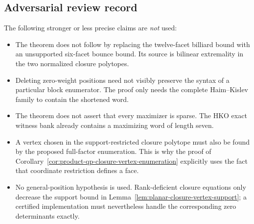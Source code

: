 \begin{unverified}
\subsection{Adversarial review record}
\label{subsec:product-qp-six-facet-adversarial-review}

The following stronger or less precise claims are \emph{not} used:
\begin{itemize}
  \item The theorem does not follow by replacing the twelve-facet billiard
    bound with an unsupported six-facet bounce bound.  Its source is bilinear
    extremality in the two normalized closure polytopes.
  \item Deleting zero-weight positions need not visibly preserve the syntax of
    a particular block enumerator.  The proof only needs the complete
    Haim--Kislev family to contain the shortened word.
  \item The theorem does not assert that every maximizer is sparse.  The HKO
    exact witness bank already contains a maximizing word of length seven.
  \item A vertex chosen in the support-restricted closure polytope must also be
    found by the proposed full-factor enumeration.  This is why the proof of
    Corollary~\ref{cor:product-qp-closure-vertex-enumeration} explicitly uses
    the fact that coordinate restriction defines a face.
  \item No general-position hypothesis is used.  Rank-deficient closure
    equations only decrease the support bound in
    Lemma~\ref{lem:planar-closure-vertex-support}; a certified implementation
    must nevertheless handle the corresponding zero determinants exactly.
\end{itemize}

\end{unverified}
